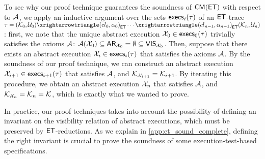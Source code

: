 To see why our proof technique guarantees the soundness of $\CMs(\ET)$ with respect 
to $\mathcal{A}$, we apply an inductive argument over the sets $\execs_{i}(\tau)$ of an $\mathsf{ET}$-trace $\tau = 
(\mkvs_{0}, \vienv_{0})  \toET{(\cl_{0}, \alpha_{0})} \cdots  \toET{(\cl_{n-1}, \alpha_{n-1})} (\mkvs_{n}, \vienv_{n})$: 
first, we note that the unique abstract execution $\aexec_{0} \in \execs_{0}(\tau)$ trivially satisfies the axioms
$\mathcal{A}$: $\mathcal{A}(\mathcal{X}_{0}) \subseteq \mathsf{AR}_{\mathcal{X}_{0}} = \emptyset \subseteq \mathsf{VIS}_{\mathcal{X}_{0}}$. 
Then, suppose that there exists an abstract execution $\aexec_{i} \in \execs_{i}(\tau)$ that satisfies 
the axioms $\mathcal{A}$. By the soundness of our proof technique, we can construct an abstract execution 
$\aexec_{i+1} \in \execs_{i+1}(\tau)$ that satisfies $\mathcal{A}$, and $\mathcal{K}_{\mathcal{X}_{i+1}} = \mathcal{K}_{i+1}$. 
By iterating this procedure, we obtain an abstract execution $\mathcal{X}_{n}$  that satisfies $\mathcal{A}$, and $\mathcal{K}_{\mathcal{X}_{n}} = \mathcal{K}_{n} = \mathcal{K}$, 
which is exactly what we wanted to prove.
%

In practice, our proof techniques takes into account the possibility of defining an invariant 
on the visibility relation of abstract executions, which must be preserved by $\mathsf{ET}$-reductions. As we explain in \cref{app:et_sound_complete}, defining the right invariant 
is crucial to prove the soundness of some execution-test-based specifications.

